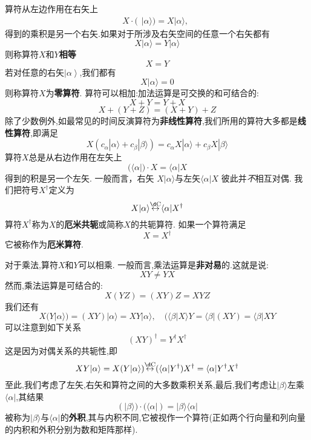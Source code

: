 算符从左边作用在右矢上
$$X\cdot(\begin{array}{c}|\alpha\rangle)=X|\alpha\rangle,\end{array}$$
得到的乘积是另一个右矢.如果对于所涉及右矢空间的任意一个右矢都有
$$X|\alpha\rangle=Y|\alpha\rangle$$
则称算符$X$和$Y$\textbf{相等}
$$X=Y$$
若对任意的右矢$\left|\alpha\right\rangle$,我们都有
$$X|\alpha\rangle=0$$
则称算符$X$为\textbf{零算符}. 算符可以相加:加法运算是可交换的和可结合的:
$$X+Y=Y+X$$
$$X+(Y+Z)=(X+Y)+Z$$
除了少数例外,如最常见的时间反演算符为\textbf{非线性算符},我们所用的算符大多都是\textbf{线性算符},即满足
\begin{equation}
	X(c_\alpha|\alpha\rangle+c_\beta|\beta\rangle)=c_\alpha X|\alpha\rangle+c_\beta X|\beta\rangle 
\end{equation}
算符$X$总是从右边作用在左矢上
\begin{equation}
	(\langle\alpha|)\cdot X=\langle\alpha|X
\end{equation}
得到的积是另一个左矢. 一般而言，右矢 $X|\alpha\rangle$与左矢$\langle\alpha|X$ 彼此并\textit{不}相互对偶. 我们把符号$X^\dagger$定义为
\begin{equation}
	X|\alpha\rangle\overset{\mathrm{\d C}}{\operatorname*{\leftrightarrow}}\langle\alpha| X^\dagger
\end{equation}
算符$X^\dagger$称为$X$的\textbf{厄米共轭}或简称$X$的共轭算符. 如果一个算符满足
\begin{equation}
	X=X^\dagger
\end{equation}
它被称作为\textbf{厄米算符}.

对于乘法,算符$X$和$Y$可以相乘. 一般而言,乘法运算是\textbf{非对易}的.这就是说:
\begin{equation}
	XY\ne YX 
\end{equation}
然而,乘法运算是可结合的:
\begin{equation}
	X(YZ)=(XY)Z=XYZ
\end{equation}
我们还有
$$X(Y|\alpha\rangle)=(XY)|\alpha\rangle=XY|\alpha\rangle,\quad(\langle\beta|X\rangle Y=\langle\beta|(XY)=\langle\beta|XY$$
可以注意到如下关系
\begin{equation}
	(XY)^\dagger=Y^\dagger X^\dagger
\end{equation}
这是因为对偶关系的共轭性,即
\begin{equation}
	XY|\alpha\rangle=X(Y|\alpha\rangle)\overset{\mathrm{\d C}}{\operatorname*{\leftrightarrow}}(\langle\alpha|Y^\dagger)X^\dagger=\langle\alpha|Y^\dagger X^\dagger 
\end{equation}
至此,我们考虑了左矢,右矢和算符之间的大多数乘积关系,最后,我们考虑让$|\beta\rangle$左乘$\langle\alpha|$,其结果
\begin{equation}
	(|\beta\rangle)\cdot(\langle\alpha|)=|\beta\rangle\langle\alpha|
\end{equation}
被称为$|\beta\rangle$与$\langle\alpha|$的\textbf{外积},其与内积不同,它被视作一个算符(正如两个行向量和列向量的内积和外积分别为数和矩阵那样).

